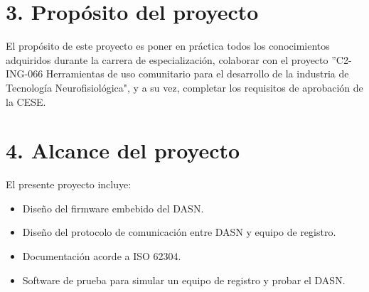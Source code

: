 \documentclass[
11pt, %
codirector, %
]{charter}
\begin{document}
%
%
%
% 
%

\section{3. Propósito del proyecto}
\label{sec:proposito}

El propósito de este proyecto es poner en práctica todos los conocimientos adquiridos durante la carrera de especialización, colaborar con el proyecto ''C2-ING-066 Herramientas de uso comunitario para el desarrollo de la industria de Tecnología Neurofisiológica", y a su vez, completar los requisitos de aprobación de la CESE.

%

\section{4. Alcance del proyecto}
\label{sec:alcance}

El presente proyecto incluye:
\begin{itemize}
	\item Diseño del firmware embebido del DASN.
	\item Diseño del protocolo de comunicación entre DASN y equipo de registro.
	\item Documentación acorde a ISO 62304.
	\item Software de prueba para simular un equipo de registro y probar el DASN.
\end{itemize}
\end{document}
